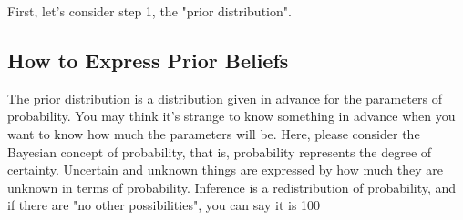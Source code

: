 \documentclass{ltjsbook}
\begin{document}
First, let's consider step 1, the "prior distribution".
\subsection{How to Express Prior Beliefs}
The prior distribution is a distribution given in advance for the parameters of probability. You may think it's strange to know something in advance when you want to know how much the parameters will be.
Here, please consider the Bayesian concept of probability, that is, probability represents the degree of certainty. Uncertain and unknown things are expressed by how much they are unknown in terms of probability. Inference is a redistribution of probability, and if there are "no other possibilities", you can say it is 100%


\end{document}
